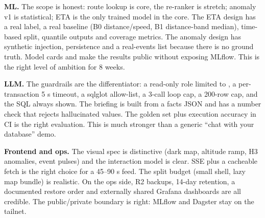 \documentclass[10.5pt]{article}
\begin{document}
\vspace{3pt}
\begin{card}
{\bfseries ML.} The scope is honest: route lookup is core, the re-ranker is stretch; anomaly v1 is statistical; ETA is the only trained model in the core. The ETA design has a real label, a real baseline (B0 distance/speed, B1 distance-band median), time-based split, quantile outputs and coverage metrics. The anomaly design has synthetic injection, persistence and a real-events list because there is no ground truth. Model cards and  make the results public without exposing MLflow. This is the right level of ambition for 8 weeks.
\end{card}

\vspace{3pt}
\begin{card}
{\bfseries LLM.} The guardrails are the differentiator: a read-only role limited to , a per-transaction 5 s timeout, a sqlglot allow-list, a 3-call loop cap, a 200-row cap, and the SQL always shown. The briefing is built from a facts JSON and has a number check that rejects hallucinated values. The golden set plus execution accuracy in CI is the right evaluation. This is much stronger than a generic ``chat with your database'' demo.
\end{card}

\vspace{3pt}
\begin{card}
{\bfseries Frontend and ops.} The visual spec is distinctive (dark map, altitude ramp, H3 anomalies, event pulses) and the interaction model is clear. SSE  plus a cacheable  fetch is the right choice for a 45--90 s feed. The split budget (small shell, lazy map bundle) is realistic. On the ops side, R2 backups, 14-day retention, a documented restore order and externally shared Grafana dashboards are all credible. The public/private boundary is right: MLflow and Dagster stay on the tailnet.
\end{card}

\end{document}
